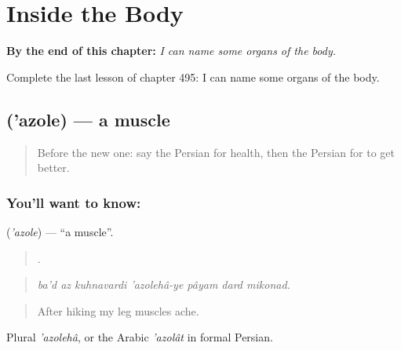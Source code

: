 
\chapter{Inside the Body}
\label{ch:fa-inside-the-body}

\begin{chapteropening}
\textbf{By the end of this chapter:} \emph{I can name some organs of the body.}

Complete the last lesson of chapter 495: I can name some organs of the body.
\end{chapteropening}

\section[\texorpdfstring{\fa{عضله} ('azole)}{عضله ('azole)}]{ ('azole) — a muscle}

\label{lesson:FA-C495-azole}



\begin{quote}
Before the new one: say the Persian for health, then the Persian for to get better.
\end{quote}

\subsection*{You'll want to know: }
\textbf{} (\emph{'azole}) — \textquotedblleft{}a muscle\textquotedblright{}.

\begin{quote}
       .
\end{quote}

\begin{quote}
\emph{ba'd az kuhnavardi 'azolehâ-ye pâyam dard mikonad.}
\end{quote}

\begin{quote}
After hiking my leg muscles ache.
\end{quote}

Plural \emph{'azolehâ}, or the Arabic \emph{'azolât} in formal Persian.

